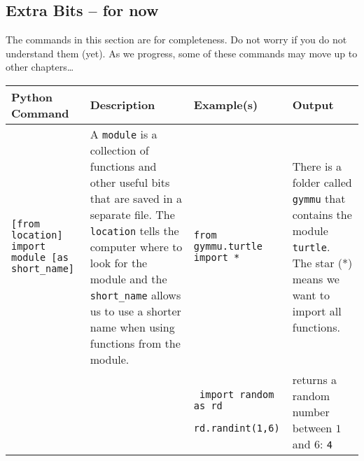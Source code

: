 \documentclass[11pt,a4paper]{report}
\begin{document}
\subsection{Extra Bits -- for now}
The commands in this section are for completeness. Do not worry if you do not understand them (yet).  As we progress, some of these commands may move up to other chapters\ldots

\begin{longtable}{|p{}|p{}|p{}|p{}|}
\hline
Python Command & Description & Example(s) & Output  \\
\hline 
\endhead
\lstinline|[from location] import module [as short_name]| & A \verb|module| is a collection of functions and other useful bits that are saved in a separate file. The \verb|location| tells the computer where to look for the module and the \verb|short_name| allows us to use a shorter name when using functions from the module. & \lstinline|from gymmu.turtle import *| & There is a folder called \verb|gymmu| that contains the module \verb|turtle|. The star (*) means we want to import all functions. \\
\hline
 && \begin{lstlisting}
 import random as rd
 rd.randint(1,6)
 \end{lstlisting}
 & returns a random number between $1$ and $6$: \newline
 \verb|4| \\
 \hline
\end{longtable}
\end{document}

